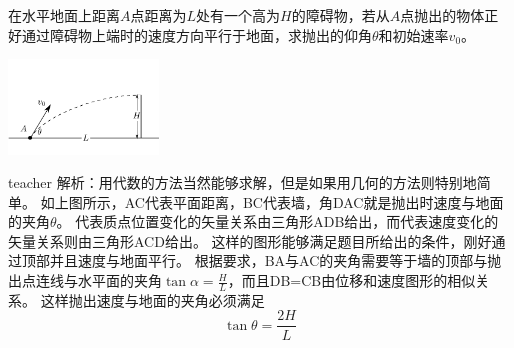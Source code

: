 \begin{example}
在水平地面上距离$A$点距离为$L$处有一个高为$H$的障碍物，若从$A$点抛出的物体正好通过障碍物上端时的速度方向平行于地面，求抛出的仰角$\theta$和初始速率$v_0$。
\begin{flushright}
\includegraphics[width=0.3\textwidth]{images/motion-11.pdf} 
\end{flushright}

\begin{taggedblock}{teacher}
\noindent
解析：用代数的方法当然能够求解，但是如果用几何的方法则特别地简单。
如上图所示，AC代表平面距离，BC代表墙，角DAC就是抛出时速度与地面的夹角$\theta$。
代表质点位置变化的矢量关系由三角形ADB给出，而代表速度变化的矢量关系则由三角形ACD给出。
这样的图形能够满足题目所给出的条件，刚好通过顶部并且速度与地面平行。
根据要求，BA与AC的夹角需要等于墙的顶部与抛出点连线与水平面的夹角$\tan\alpha = \frac{H}{L}$，而且DB=CB由位移和速度图形的相似关系。
这样抛出速度与地面的夹角必须满足
\[
\tan\theta = \frac{2H}{L}
\]

\end{taggedblock}
\end{example}


